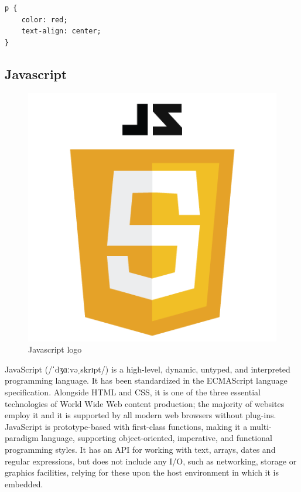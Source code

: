 \begin{verbatim}
p {
    color: red;
    text-align: center;
} 
\end{verbatim}

\subsection{Javascript}
\begin{figure}[h]
\centering \includegraphics[scale=0.3]{images/JS.png}
\caption{Javascript logo}
\end{figure}
JavaScript (/ˈdʒɑːvəˌskrɪpt/) is a high-level, dynamic, untyped, and interpreted programming language. It has been standardized in the ECMAScript language specification. Alongside HTML and CSS, it is one of the three essential technologies of World Wide Web content production; the majority of websites employ it and it is supported by all modern web browsers without plug-ins. JavaScript is prototype-based with first-class functions, making it a multi-paradigm language, supporting object-oriented, imperative, and functional programming styles. It has an API for working with text, arrays, dates and regular expressions, but does not include any I/O, such as networking, storage or graphics facilities, relying for these upon the host environment in which it is embedded.

